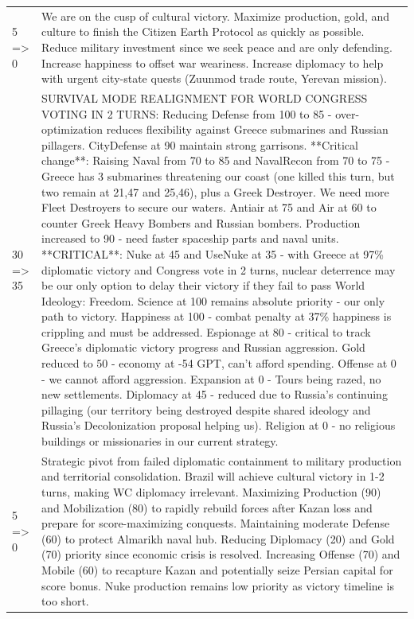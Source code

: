 \begin{longtable}{p{}p{}}
5 => 0 & We are on the cusp of cultural victory. Maximize production, gold, and culture to finish the Citizen Earth Protocol as quickly as possible. Reduce military investment since we seek peace and are only defending. Increase happiness to offset war weariness. Increase diplomacy to help with urgent city-state quests (Zuunmod trade route, Yerevan mission). \\
30 => 35 & SURVIVAL MODE REALIGNMENT FOR WORLD CONGRESS VOTING IN 2 TURNS: Reducing Defense from 100 to 85 - over-optimization reduces flexibility against Greece submarines and Russian pillagers. CityDefense at 90 maintain strong garrisons. **Critical change**: Raising Naval from 70 to 85 and NavalRecon from 70 to 75 - Greece has 3 submarines threatening our coast (one killed this turn, but two remain at 21,47 and 25,46), plus a Greek Destroyer. We need more Fleet Destroyers to secure our waters. Antiair at 75 and Air at 60 to counter Greek Heavy Bombers and Russian bombers. Production increased to 90 - need faster spaceship parts and naval units. **CRITICAL**: Nuke at 45 and UseNuke at 35 - with Greece at 97\% diplomatic victory and Congress vote in 2 turns, nuclear deterrence may be our only option to delay their victory if they fail to pass World Ideology: Freedom. Science at 100 remains absolute priority - our only path to victory. Happiness at 100 - combat penalty at 37\% happiness is crippling and must be addressed. Espionage at 80 - critical to track Greece's diplomatic victory progress and Russian aggression. Gold reduced to 50 - economy at -54 GPT, can't afford spending. Offense at 0 - we cannot afford aggression. Expansion at 0 - Tours being razed, no new settlements. Diplomacy at 45 - reduced due to Russia's continuing pillaging (our territory being destroyed despite shared ideology and Russia's Decolonization proposal helping us). Religion at 0 - no religious buildings or missionaries in our current strategy. \\
5 => 0 & Strategic pivot from failed diplomatic containment to military production and territorial consolidation. Brazil will achieve cultural victory in 1-2 turns, making WC diplomacy irrelevant. Maximizing Production (90) and Mobilization (80) to rapidly rebuild forces after Kazan loss and prepare for score-maximizing conquests. Maintaining moderate Defense (60) to protect Almarikh naval hub. Reducing Diplomacy (20) and Gold (70) priority since economic crisis is resolved. Increasing Offense (70) and Mobile (60) to recapture Kazan and potentially seize Persian capital for score bonus. Nuke production remains low priority as victory timeline is too short. \\

\end{longtable}
